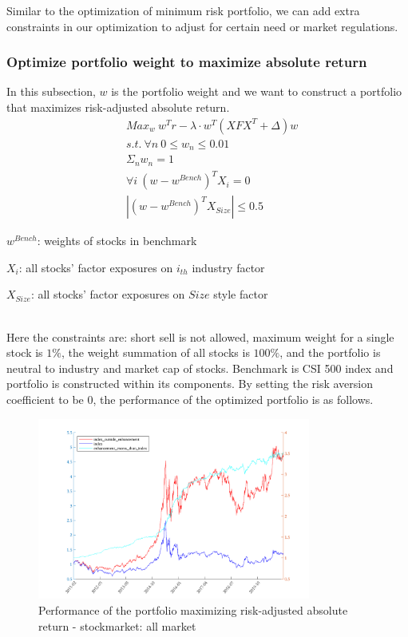 \documentclass[10pt]{article}
\begin{document}
Similar to the optimization of minimum risk portfolio, we can add extra constraints in our optimization to adjust for certain need or market regulations.

\subsubsection{Optimize portfolio weight to maximize absolute return}
In this subsection, $w$ is the portfolio weight and we want to construct a portfolio that maximizes risk-adjusted absolute return.
~\\
\begin{equation}
\begin{split}
    &Max_w\ w^Tr-\lambda\cdot w^T(XFX^T+\Delta)w\\
    &s.t.\ \forall n\ 0\leq w_n\leq0.01\\
    &\Sigma_nw_n=1\\
    &\forall i\ (w-w^{Bench})^TX_i=0\\
    &|(w-w^{Bench})^TX_{Size}|\leq0.5
\end{split}
\end{equation}
\centerline{$w^{Bench}$: weights of stocks in benchmark}
\centerline{$X_i$: all stocks' factor exposures on $i_{th}$ industry factor}
\centerline{$X_{Size}$: all stocks' factor exposures on $Size$ style factor}
~\\
Here the constraints are: short sell is not allowed, maximum weight for a single stock is $1\%$, the weight summation of all stocks is $100\%$, and the portfolio is neutral to industry and market cap of stocks. Benchmark is CSI 500 index and portfolio is constructed within its components. By setting the risk aversion coefficient to be 0, the performance of the optimized portfolio is as follows.

\begin{figure}[H]
    \centering
     \includegraphics[width=0.8\textwidth,height=0.4\textwidth]{outside_enhancement_than_index.png}
    \caption{Performance of the portfolio maximizing risk-adjusted absolute return - stockmarket: all market}
    \label{fig:Fig12}
\end{figure}
\end{document}
